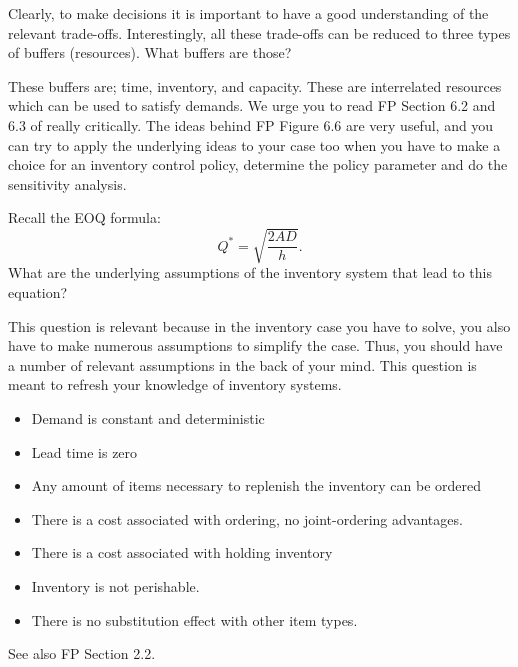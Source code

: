 \begin{question}
  Clearly, to make decisions it is important to have a good understanding
  of the relevant trade-offs. Interestingly, all these trade-offs can
  be reduced to three types of buffers (resources). What buffers are those?

\end{question}

  \begin{solution}
    These buffers are; time, inventory, and capacity. These are interrelated resources which can be used to satisfy demands. We urge you to read
    FP Section 6.2 and 6.3 of really critically. The ideas
    behind FP Figure 6.6 are very useful, and you can try to apply the
    underlying ideas to your case too when you have to make a choice
    for an inventory control policy, determine the policy parameter
    and do the sensitivity analysis.
  \end{solution}


\begin{question}\label{ex:1}
  Recall the EOQ formula:
  \begin{equation*}
    Q^* = \sqrt{\frac{ 2 A D}{h}}.
  \end{equation*}
What are the underlying assumptions of the inventory system that lead to this equation?

This question is relevant because in the inventory case you have to
solve, you also have to make numerous assumptions to simplify the
case. Thus, you should have a number of relevant assumptions in the
back of your mind.  This question is meant to refresh your knowledge
of inventory systems.
\end{question}

\begin{solution}
\begin{itemize}
\item Demand is constant and deterministic
\item Lead time is zero
\item Any amount of items necessary to replenish the inventory can be
  ordered
\item There is a cost associated with ordering, no joint-ordering advantages.
\item There is a cost associated with holding inventory
\item Inventory is not perishable.
\item There is no substitution effect with other item types.
\end{itemize}
See also FP Section 2.2.
\end{solution}

